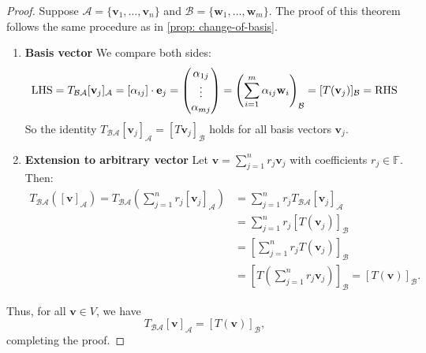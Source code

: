 \begin{proof}
Suppose \( \mathcal{A} = \{ \mathbf{v}_1, \dots, \mathbf{v}_n \} \) and \( \mathcal{B} = \{ \mathbf{w}_1, \dots, \mathbf{w}_m \} \). The proof of this theorem follows the same procedure as in \autoref{prop: change-of-basis}.

\begin{enumerate}
    \item \textbf{Basis vector} We compare both sides:
\begin{align*}
\text{LHS} = T_{\mathcal{B}\mathcal{A}} [{\bf v}_j]_{\mathcal{A}} = [\alpha_{ij}] \cdot \mathbf{e}_j = \begin{pmatrix} \alpha_{1j} \\ \vdots \\ \alpha_{mj} \end{pmatrix} = \left( \sum_{i=1}^{m} \alpha_{ij} \mathbf{w}_i \right)_{\mathcal{B}} = [T (\mathbf{v}_j)]_{\mathcal{B}} = \text{RHS} 
\end{align*}
So the identity \( T_{\mathcal{B}\mathcal{A}} [\mathbf{v}_j]_{\mathcal{A}} = [T\mathbf{v}_j]_{\mathcal{B}} \) holds for all basis vectors \( \mathbf{v}_j \).

\item \textbf{Extension to arbitrary vector}
Let \( \mathbf{v} = \sum_{j=1}^n r_j \mathbf{v}_j \) with coefficients \( r_j \in \mathbb{F} \). Then:
\begin{align*}
T_{\mathcal{B}\mathcal{A}}([\mathbf{v}]_{\mathcal{A}}) = T_{\mathcal{B}\mathcal{A}}\left( \sum_{j=1}^n r_j [\mathbf{v}_j]_{\mathcal{A}} \right) 
&= \sum_{j=1}^n r_j T_{\mathcal{B}\mathcal{A}}[\mathbf{v}_j]_{\mathcal{A}}  \\
&= \sum_{j=1}^n r_j [T (\mathbf{v}_j)]_{\mathcal{B}}  \\
&= \left[ \sum_{j=1}^n r_j T(\mathbf{v}_j)\right]_{\mathcal{B}}\\
&= [T(\sum_{j=1}^n r_j \mathbf{v}_j)]_{\mathcal{B}} = [T( \mathbf{v})]_{\mathcal{B}}.
\end{align*}
\end{enumerate}

Thus, for all \( \mathbf{v} \in V \), we have
\[
T_{\mathcal{B}\mathcal{A}} [\mathbf{v}]_{\mathcal{A}} = [T(\mathbf{v})]_{\mathcal{B}},
\]
completing the proof.
\end{proof}

